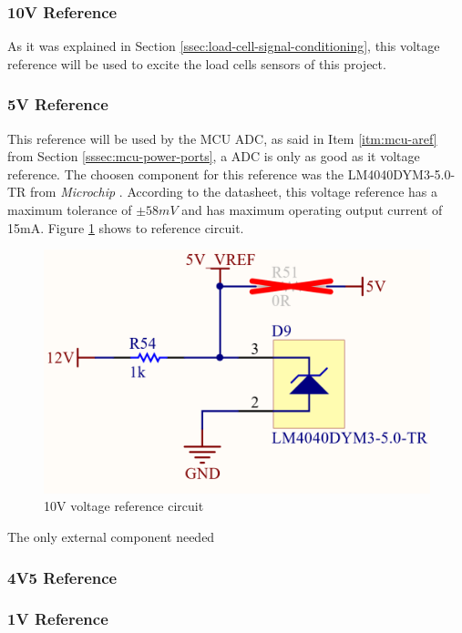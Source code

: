 		\subsubsection{10V Reference}\label{sssec:10v-reference}
			As it was explained in Section \ref{ssec:load-cell-signal-conditioning}, this voltage reference will be used to excite the load cells sensors of this project.
		\subsubsection{5V Reference}\label{sssec:5v-reference}
			This reference will be used by the MCU ADC, as said in Item \ref{itm:mcu-aref} from Section \ref{sssec:mcu-power-ports}, a ADC is only as good as it voltage reference. The choosen component for this reference was the LM4040DYM3-5.0-TR from \textit{Microchip} \cite{LM4040DYM3-5.0-TR-datasheet}. According to the datasheet, this voltage reference has a maximum tolerance of $\pm 58mV$ and has maximum operating output current of 15mA. Figure \ref{fig:LM4040DYM3-5.0-TR-circuit} shows to reference circuit.

			\begin{figure}[htbp]
				\centering
					\includegraphics[scale=0.4]{figuras/fig-LM4040DYM3-5.0-TR-circuit.png}
				\caption{10V voltage reference circuit \cite{LM4040DYM3-5.0-TR-circuit}}
				\label{fig:LM4040DYM3-5.0-TR-circuit}
			\end{figure}

			The only external component needed

		\subsubsection{4V5 Reference}\label{sssec:4v5-reference}
		\subsubsection{1V Reference}\label{sssec:1v-reference}